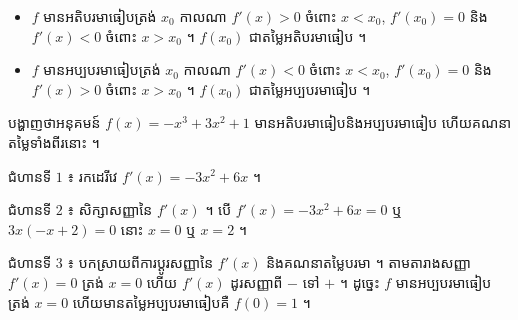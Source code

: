 \begin{formulaBox}[ជាទូទៅ]
\begin{itemize}
  \item $f$ មានអតិបរមាធៀបត្រង់ $x_0$ កាលណា $f'(x) > 0$ ចំពោះ $x < x_0$, $f'(x_0) = 0$ និង $f'(x) < 0$ ចំពោះ $x > x_0$ ។ $f(x_0)$ ជាតម្លៃអតិបរមាធៀប ។
  \item $f$ មានអប្បបរមាធៀបត្រង់ $x_0$ កាលណា $f'(x) < 0$ ចំពោះ $x < x_0$, $f'(x_0) = 0$ និង $f'(x) > 0$ ចំពោះ $x > x_0$ ។ $f(x_0)$ ជាតម្លៃអប្បបរមាធៀប ។
\end{itemize}
\end{formulaBox}

\begin{center}
\end{center}

\begin{example}[លំហាត់គំរូ ១]
បង្ហាញថាអនុគមន៍ $f(x) = -x^3 + 3x^2 + 1$ មានអតិបរមាធៀបនិងអប្បបរមាធៀប ហើយគណនាតម្លៃទាំងពីរនោះ ។
\end{example}
\ans
ជំហានទី $1$ ៖ រកដេរីវេ $f'(x) = -3x^2 + 6x$ ។

ជំហានទី $2$ ៖ សិក្សាសញ្ញានៃ $f'(x)$ ។ បើ $f'(x) = -3x^2 + 6x = 0$ ឬ $3x(-x + 2) = 0$ នោះ $x = 0$ ឬ $x = 2$ ។
\begin{center}
\end{center}
ជំហានទី $3$ ៖ បកស្រាយពីការប្ដូរសញ្ញានៃ $f'(x)$ និងគណនាតម្លៃបរមា ។ តាមតារាងសញ្ញា $f'(x) = 0$ ត្រង់ $x = 0$ ហើយ $f'(x)$ ដូរសញ្ញាពី $-$ ទៅ $+$ ។ ដូច្នេះ $f$ មានអប្បបរមាធៀបត្រង់ $x = 0$ ហើយមានតម្លៃអប្បបរមាធៀបគឺ $f(0) = 1$ ។


